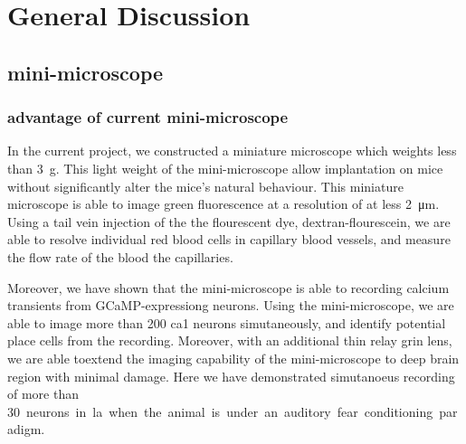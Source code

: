 \chapter{General Discussion}
\begin{comment}
\section{Summary of result}
\subsection{Summary of result}
\subsubsection{Hyperactivity}
\subsubsection{Cellular freezing encoding}
\subsubsection{Network freezing encoding}
\end{comment}
\section{mini-microscope}
\subsection{advantage of current mini-microscope}
In the current project, we constructed a miniature microscope which weights less than \SI{3}{\gram}. This light weight of the mini-microscope allow implantation on mice without significantly alter the mice's natural behaviour.  This miniature microscope is able to image green fluorescence at a resolution of at less \SI{2}{\um}. Using a tail vein injection of the the flourescent dye, dextran-flourescein, we are able to resolve individual red blood cells in capillary blood vessels, and measure the flow rate of the blood the capillaries. 

Moreover, we have shown that the mini-microscope is able to recording calcium transients from GCaMP-expressiong neurons. Using the mini-microscope, we are able to image more than \num{200} \gls{ca1} neurons simutaneously, and identify potential place cells from the recording. Moreover, with an additional thin relay \gls{grin} lens, we are able toextend the imaging capability of the mini-microscope to deep brain region with minimal damage. Here we have demonstrated simutanoeus recording of more than \SI{30} neurons in \gls{la} when the animal is under an auditory fear conditioning paradigm. 

